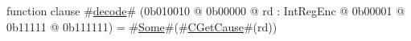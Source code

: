 function clause #\hyperref[zdecode]{decode}# (0b010010 @ 0b00000 @ rd : IntRegEnc @    0b00001 @    0b11111 @ 0b111111) = #\hyperref[zSome]{Some}#(#\hyperref[zCGetCause]{CGetCause}#(rd))

